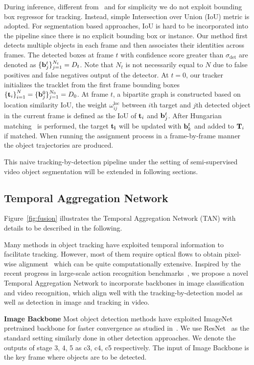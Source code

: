 \documentclass[10pt,twocolumn,letterpaper]{article}
\begin{document}
During inference, different from~\cite{bergmann2019tracking} and for simplicity we do  not exploit bounding box regressor for tracking.
Instead, simple Intersection over Union (IoU) metric is adopted.
For segmentation based approaches, IoU is hard to be incorporated into the pipeline since there is no explicit bounding box or instance.
Our method first detects multiple objects in each frame and then associates their identities across frames.
The detected boxes at frame $t$ with confidence score greater than $\sigma_{\text{det}}$ are denoted as $\{{\bf{b}}^t_{j}\}_{j=1}^{N_t} = D_t$.
Note that $N_t$ is not necessarily equal to $N$ due to false positives and false negatives output of the detector.
At $t=0$, our tracker initializes the tracklet from the first frame bounding boxes ${\{{\bf{t}}_i\}}_{i=1}^{N} = \{{\bf{b}}^0_{j}\}_{j=1}^{N_0} = D_0$.
At frame $t$, a bipartite graph is constructed based on location similarity IoU, the weight $\omega^{\text{loc}}_{ij}$ between $i$th target and $j$th detected object in the current frame is defined as the IoU of ${\bf{t}}_i$ and ${\bf{b}}^t_j$.
After Hungarian matching~\cite{munkres1957algorithms} is performed, the target ${\bf{t}_i}$ will be updated with ${\bf{b}}^t_k$ and added to ${\bf{T}}_i$ if matched.
When running the assignment process in a frame-by-frame manner the object trajectories are produced.

This naive tracking-by-detection pipeline under the setting of semi-supervised video object segmentation will be extended in following sections.

\subsection{Temporal Aggregation Network}
Figure~\ref{fig:fusion} illustrates the Temporal Aggregation Network (TAN) with  details to be described in the following.

Many methods in object tracking have exploited temporal information to facilitate tracking.
However, most of them require optical flows to obtain pixel-wise alignment~\cite{zhu2017dff, zhu2017fgfa} which can be quite computationally extensive.
Inspired by the recent progress in large-scale action recognition benchmarks~\cite{carreira2017i3d, gu2018ava}, we propose a novel Temporal Aggregation Network to incorporate backbones in image classification and video recognition, which align well with the tracking-by-detection model as well as detection in image and tracking in video.

\textbf{Image Backbone}
Most object detection methods have exploited ImageNet~\cite{deng2009imagenet} pretrained backbone for faster convergence as studied in~\cite{he2018rethinking}.
We use ResNet~\cite{he2016resnet} as the standard setting similarly done in other detection approaches.
We denote the outputs of stage 3, 4, 5 as c3, c4, c5 respectively.
The input of Image Backbone is the key frame where objects are to be detected.
\end{document}
